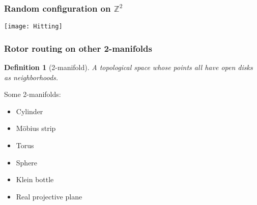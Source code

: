 \documentclass{beamer}
\newtheorem{defn}{Definition}
\begin{document}
\begin{frame}
	\frametitle{Random configuration on $\mathbb{Z}^2$}
	
	\texttt{[image: Hitting]}
	
\end{frame}


\begin{frame}
	\frametitle{Rotor routing on other 2-manifolds}
	
	\pause
	
	\begin{defn}[2-manifold]
		A topological space whose points all have open disks as neighborhoods.
	\end{defn}
	
	\pause
	
	\hspace{2cm}
	
	Some 2-manifolds:
	\begin{multicols}{2}
		\begin{itemize}
			\item Cylinder
			\item M{\"o}bius strip
			\item Torus
			\item Sphere
			\item Klein bottle
			\item Real projective plane
		\end{itemize}
	\end{multicols}

\end{frame}
\end{document}
